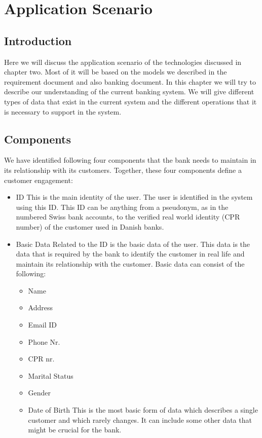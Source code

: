 \chapter{Application Scenario}
\section{Introduction}
Here we will discuss the application scenario of the technologies discussed in chapter two. Most of it will be based on the models we described in the requirement document and also banking document.
In this chapter we will try to describe our understanding of the current banking system. We will give different types of data that exist in the current system and the different operations that it is necessary to support in the system.
\section{Components}
We have identified following four components that the bank needs to maintain in its relationship with its customers. Together, these four components define a customer engagement:
\begin{itemize}
\item ID
This is the main identity of the user. The user is identified in the system using this ID. This ID can be anything from a pseudonym, as in the numbered Swiss bank accounts, to the verified real world identity (CPR number) of the customer used in Danish banks. 
\end{itemize}
\begin{itemize}
\item Basic Data
Related to the ID is the basic data of the user. This data is the data that is required by the bank to identify the customer in real life and maintain its relationship with the customer. Basic data can consist of the following:
\begin{itemize}
\item Name
\item Address
\item Email ID
\item Phone Nr.
\item CPR nr.
\item Marital Status
\item Gender
\item Date of Birth
This is the most basic form of data which describes a single customer and which rarely changes. It can include some other data that might be crucial for the bank.
\end{itemize}
\end{itemize}
